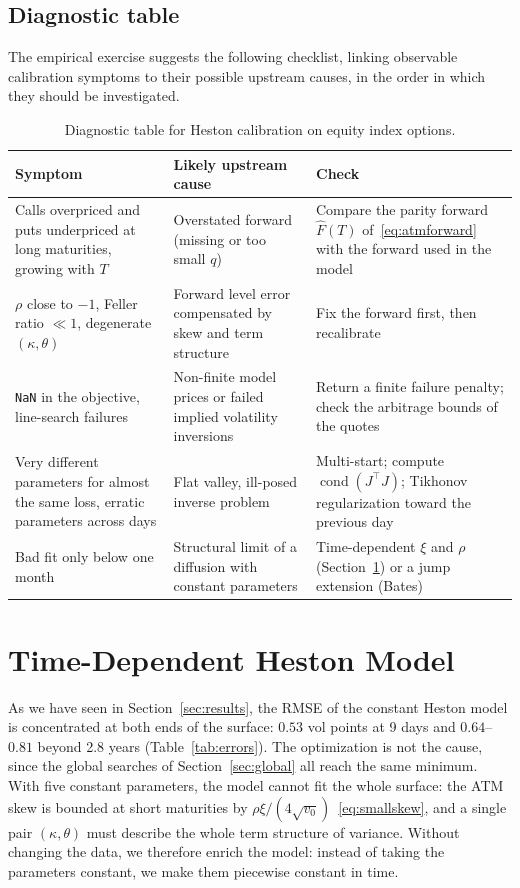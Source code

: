 \documentclass[11pt,a4paper]{article}
\theoremstyle{plain}
\theoremstyle{definition}
\begin{document}
\subsection{Diagnostic table}
The empirical exercise suggests the following checklist, linking observable calibration symptoms to their possible upstream causes, in the order in which they should be investigated.

\begin{table}[h]
\centering
\small
\begin{tabular}{@{}p{4.2cm}p{4.6cm}p{5.6cm}@{}}
\toprule
Symptom & Likely upstream cause & Check \\
\midrule
Calls overpriced and puts underpriced at long maturities, growing with $T$ & Overstated forward (missing or too small $q$) & Compare the parity forward $\hat F(T)$ of~\eqref{eq:atmforward} with the forward used in the model \\
$\rho$ close to $-1$, Feller ratio $\ll1$, degenerate $(\kappa,\theta)$ & Forward level error compensated by skew and term structure & Fix the forward first, then recalibrate \\
\texttt{NaN} in the objective, line-search failures & Non-finite model prices or failed implied volatility inversions & Return a finite failure penalty; check the arbitrage bounds of the quotes \\
Very different parameters for almost the same loss, erratic parameters across days & Flat valley, ill-posed inverse problem & Multi-start; compute $\operatorname{cond}(J^\top J)$; Tikhonov regularization toward the previous day \\
Bad fit only below one month & Structural limit of a diffusion with constant parameters & Time-dependent $\xi$ and $\rho$ (Section~\ref{sec:td}) or a jump extension (Bates) \\
\bottomrule
\end{tabular}
\caption{Diagnostic table for Heston calibration on equity index options.}
\label{tab:diag}
\end{table}



\clearpage
\section{Time-Dependent Heston Model}
\label{sec:td}

As we have seen in Section~\ref{sec:results}, the RMSE of the constant Heston model is concentrated at both ends of the surface: $0.53$ vol points at 9 days and $0.64$--$0.81$ beyond 2.8 years (Table~\ref{tab:errors}). The optimization is not the cause, since the global searches of Section~\ref{sec:global} all reach the same minimum. With five constant parameters, the model cannot fit the whole surface: the ATM skew is bounded at short maturities by $\rho\xi/(4\sqrt{v_0})$~\eqref{eq:smallskew}, and a single pair $(\kappa,\theta)$ must describe the whole term structure of variance. Without changing the data, we therefore enrich the model: instead of taking the parameters constant, we make them piecewise constant in time.
\end{document}
